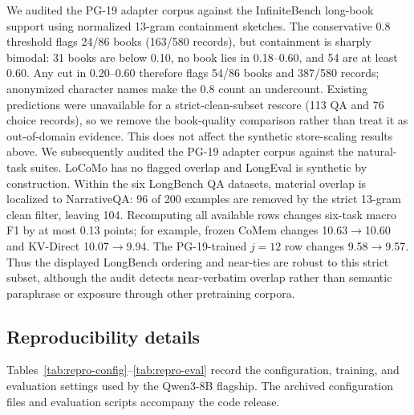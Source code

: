 We audited the PG-19 adapter corpus against the InfiniteBench long-book support
using normalized 13-gram containment sketches. The conservative 0.8 threshold
flags 24/86 books (163/580 records), but containment is sharply bimodal: 31 books
are below 0.10, no book lies in 0.18--0.60, and 54 are at least 0.60. Any cut in
0.20--0.60 therefore flags 54/86 books and 387/580 records; anonymized character
names make the 0.8 count an undercount. Existing predictions were unavailable
for a strict-clean-subset rescore (113 QA and 76 choice records), so we remove
the book-quality comparison rather than treat it as out-of-domain evidence.
This does not affect the synthetic store-scaling results above.
We subsequently audited the PG-19 adapter corpus against the natural-task
suites. LoCoMo has no flagged overlap and LongEval is synthetic by construction.
Within the six LongBench QA datasets, material overlap is localized to
NarrativeQA: 96 of 200 examples are removed by the strict 13-gram clean filter,
leaving 104. Recomputing all available rows changes six-task macro F1 by at most
0.13 points; for example, frozen CoMem changes 10.63$\rightarrow$10.60 and
KV-Direct 10.07$\rightarrow$9.94. The PG-19-trained $j{=}12$ row changes
9.58$\rightarrow$9.57. Thus the displayed LongBench ordering and near-ties are
robust to this strict subset, although the audit detects near-verbatim overlap
rather than semantic paraphrase or exposure through other pretraining corpora.

\subsection{Reproducibility details}
\label{app:reproducibility}
Tables~\ref{tab:repro-config}--\ref{tab:repro-eval} record the configuration,
training, and evaluation settings used by the Qwen3-8B flagship. The archived
configuration files and evaluation scripts accompany the code release.

